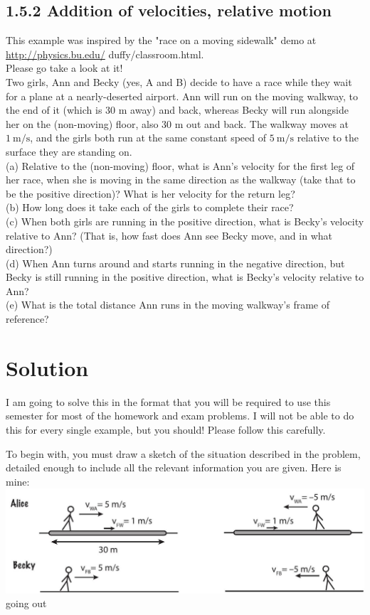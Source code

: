 \documentclass[10pt]{article}
\begin{document}
\subsection*{1.5.2 Addition of velocities, relative motion}
This example was inspired by the "race on a moving sidewalk" demo at \href{http://physics.bu.edu/}{http://physics.bu.edu/} duffy/classroom.html.\\
Please go take a look at it!\\
Two girls, Ann and Becky (yes, A and B) decide to have a race while they wait for a plane at a nearly-deserted airport. Ann will run on the moving walkway, to the end of it (which is 30 m away) and back, whereas Becky will run alongside her on the (non-moving) floor, also 30 m out and back. The walkway moves at $1 \mathrm{~m} / \mathrm{s}$, and the girls both run at the same constant speed of $5 \mathrm{~m} / \mathrm{s}$ relative to the surface they are standing on.\\
(a) Relative to the (non-moving) floor, what is Ann's velocity for the first leg of her race, when she is moving in the same direction as the walkway (take that to be the positive direction)? What is her velocity for the return leg?\\
(b) How long does it take each of the girls to complete their race?\\
(c) When both girls are running in the positive direction, what is Becky's velocity relative to Ann? (That is, how fast does Ann see Becky move, and in what direction?)\\
(d) When Ann turns around and starts running in the negative direction, but Becky is still running in the positive direction, what is Becky's velocity relative to Ann?\\
(e) What is the total distance Ann runs in the moving walkway's frame of reference?

\section*{Solution}
I am going to solve this in the format that you will be required to use this semester for most of the homework and exam problems. I will not be able to do this for every single example, but you should! Please follow this carefully.

To begin with, you must draw a sketch of the situation described in the problem, detailed enough to include all the relevant information you are given. Here is mine:\\
\includegraphics[max width=\textwidth, center]{2024_09_14_9969b06773f10b6936e8g-042(1)}\\
going out
\end{document}
